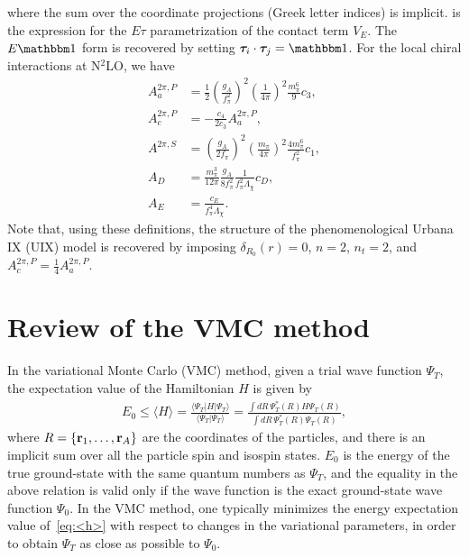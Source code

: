 \documentclass[aps,prc,twocolumn,superscriptaddress,floatfix]{revtex4-1}
\begin{document}
where the sum over the coordinate projections (Greek letter indices) is implicit.
 is the expression for the $E\tau$ parametrization of the contact term $V_E$.
The $E\mathbbm1$ form is recovered by setting $\bm{\tau}_i\cdot\bm{\tau}_j=\mathbbm1$.
For the local chiral interactions at N$^2$LO, we have
\begin{align}
A_a^{2\pi,P}&=\frac{1}{2}\left(\frac{g_A}{f_\pi^2}\right)^2\left(\frac{1}{4\pi}\right)^2
\frac{m_\pi^6}{9}c_3 \nonumber, \\
A_c^{2\pi,P}&=-\frac{c_4}{2c_3}A_a^{2\pi,P} \nonumber, \\
A^{2\pi,S}&=\left(\frac{g_A}{2f_\pi}\right)^2\left(\frac{m_\pi}{4\pi}\right)^2\frac{4m_\pi^6}{f_\pi^2}c_1
\nonumber, \\
A_D&=\frac{m_\pi^3}{12\pi}\frac{g_A}{8f_\pi^2}\frac{1}{f_\pi^2\Lambda_\chi}c_D
\nonumber, \\
A_E&=\frac{c_E}{f_\pi^4\Lambda_\chi}.
\label{eq:lecs}
\end{align}
Note that, using these definitions, the structure of the phenomenological Urbana IX (UIX) model
is recovered by imposing $\delta_{R_0}(r)=0$, $n=2$, $n_t=2$, and $A_c^{2\pi,P}=\frac{1}{4}A_a^{2\pi,P}$.


\section{Review of the VMC method}
\label{sec:vmc}
In the variational Monte Carlo (VMC) method, given a trial wave function $\Psi_T$,
the expectation value of the Hamiltonian $H$ is given by
\begin{align}
\!\!\!E_0\leq\langle H\rangle=\frac{\langle\Psi_T|H|\Psi_T\rangle}{\langle\Psi_T|\Psi_T\rangle}
=\frac{\displaystyle\int\!dR\,\Psi_T^*(R)H\Psi_T(R)}
{\displaystyle\int\!dR\,\Psi_T^*(R)\Psi_T(R)} ,
\label{eq:<h>}
\end{align}
where $R=\{\vb{r}_1,\dots,\vb{r}_A\}$ are the coordinates of the particles, and there is an 
implicit sum over all the particle spin and isospin states. 
$E_0$ is the energy of the true ground-state with the same quantum numbers as $\Psi_T$, 
and the equality in the above relation is valid only if the wave function is the exact
ground-state wave function $\Psi_0$. In the VMC method, one typically minimizes the energy expectation 
value of~\cref{eq:<h>} with respect to changes in the variational parameters, in order to 
obtain $\Psi_T$ as close as possible to $\Psi_0$. 
\end{document}
